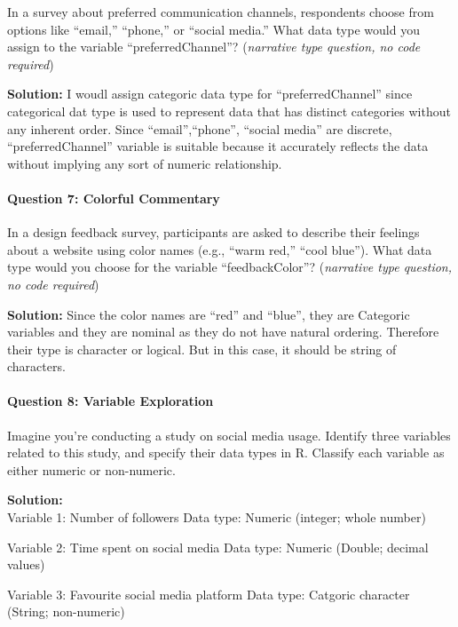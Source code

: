 \documentclass[
]{article}
\begin{document}
In a survey about preferred communication channels, respondents choose
from options like ``email,'' ``phone,'' or ``social media.'' What data
type would you assign to the variable ``preferredChannel''?
(\emph{narrative type question, no code required})

\textbf{Solution:} I woudl assign categoric data type for
``preferredChannel'' since categorical dat type is used to represent
data that has distinct categories without any inherent order. Since
``email'',``phone'', ``social media'' are discrete, ``preferredChannel''
variable is suitable because it accurately reflects the data without
implying any sort of numeric relationship.

\hypertarget{question-7-colorful-commentary}{%
\paragraph{Question 7: Colorful
Commentary}\label{question-7-colorful-commentary}}

In a design feedback survey, participants are asked to describe their
feelings about a website using color names (e.g., ``warm red,'' ``cool
blue''). What data type would you choose for the variable
``feedbackColor''? (\emph{narrative type question, no code required})

\textbf{Solution:} Since the color names are ``red'' and ``blue'', they
are Categoric variables and they are nominal as they do not have natural
ordering. Therefore their type is character or logical. But in this
case, it should be string of characters.

\hypertarget{question-8-variable-exploration}{%
\paragraph{Question 8: Variable
Exploration}\label{question-8-variable-exploration}}

Imagine you're conducting a study on social media usage. Identify three
variables related to this study, and specify their data types in R.
Classify each variable as either numeric or non-numeric.

\textbf{Solution:}\\
Variable 1: Number of followers Data type: Numeric (integer; whole
number)

Variable 2: Time spent on social media Data type: Numeric (Double;
decimal values)

Variable 3: Favourite social media platform Data type: Catgoric
character (String; non-numeric)
\end{document}
